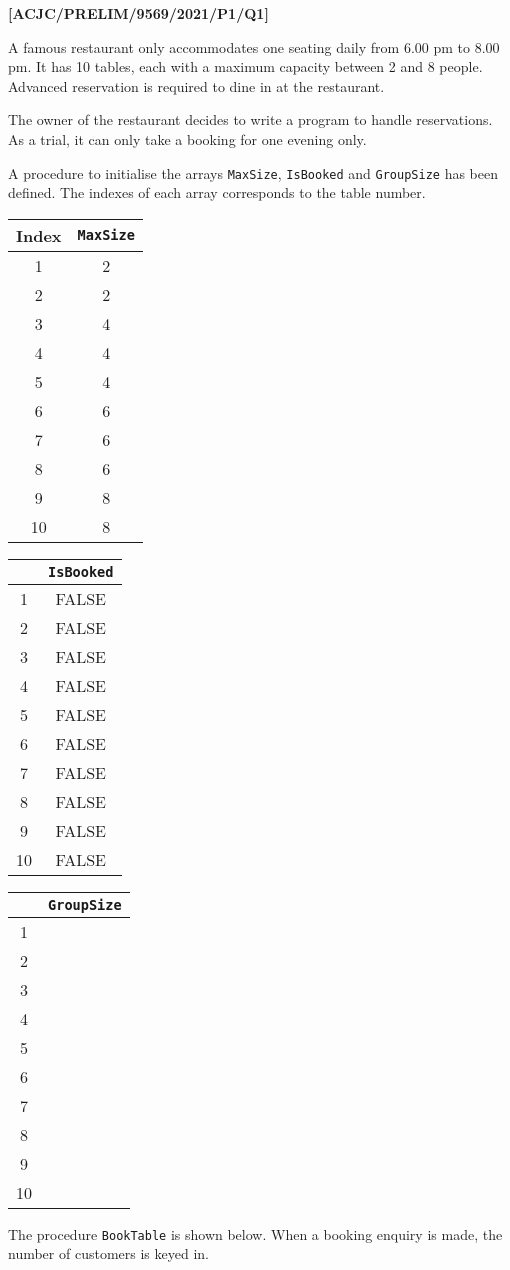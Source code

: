 \item \textbf{{[}ACJC/PRELIM/9569/2021/P1/Q1{]} }

A famous restaurant only accommodates one seating daily from 6.00
pm to 8.00 pm. It has 10 tables, each with a maximum capacity between
2 and 8 people. Advanced reservation is required to dine in at the
restaurant. 

The owner of the restaurant decides to write a program to handle reservations.
As a trial, it can only take a booking for one evening only. 

A procedure to initialise the arrays \texttt{MaxSize}, \texttt{IsBooked}
and \texttt{GroupSize} has been defined. The indexes of each array
corresponds to the table number.

\begin{tabular}{|c|c|}
\multicolumn{1}{c}{Index} & \multicolumn{1}{c}{\texttt{MaxSize}}\tabularnewline
\hline 
1 & 2\tabularnewline
\hline 
2 & 2\tabularnewline
\hline 
3 & 4\tabularnewline
\hline 
4 & 4\tabularnewline
\hline 
5 & 4\tabularnewline
\hline 
6 & 6\tabularnewline
\hline 
7 & 6\tabularnewline
\hline 
8 & 6\tabularnewline
\hline 
9 & 8\tabularnewline
\hline 
10 & 8\tabularnewline
\hline 
\end{tabular}%
\begin{tabular}{|c|c|}
\multicolumn{1}{c}{} & \multicolumn{1}{c}{\texttt{IsBooked}}\tabularnewline
\hline 
1 & FALSE\tabularnewline
\hline 
2 & FALSE\tabularnewline
\hline 
3 & FALSE\tabularnewline
\hline 
4 & FALSE\tabularnewline
\hline 
5 & FALSE\tabularnewline
\hline 
6 & FALSE\tabularnewline
\hline 
7 & FALSE\tabularnewline
\hline 
8 & FALSE\tabularnewline
\hline 
9 & FALSE\tabularnewline
\hline 
10 & FALSE\tabularnewline
\hline 
\end{tabular}%
\begin{tabular}{|c|c|}
\multicolumn{1}{c}{} & \multicolumn{1}{c}{\texttt{GroupSize}}\tabularnewline
\hline 
1 & \tabularnewline
\hline 
2 & \tabularnewline
\hline 
3 & \tabularnewline
\hline 
4 & \tabularnewline
\hline 
5 & \tabularnewline
\hline 
6 & \tabularnewline
\hline 
7 & \tabularnewline
\hline 
8 & \tabularnewline
\hline 
9 & \tabularnewline
\hline 
10 & \tabularnewline
\hline 
\end{tabular}

The procedure \texttt{BookTable} is shown below. When a booking enquiry
is made, the number of customers is keyed in. 

